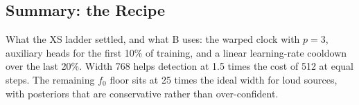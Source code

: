 \subsection{Summary: the Recipe}

What the XS ladder settled, and what B uses: the warped clock with $p=3$, auxiliary heads for
the first 10\% of training, and a linear learning-rate cooldown over the last 20\%. Width 768
helps detection at 1.5 times the cost of 512 at equal steps. The remaining $f_0$ floor sits at
25 times the ideal width for loud sources, with posteriors that are conservative rather than
over-confident.
